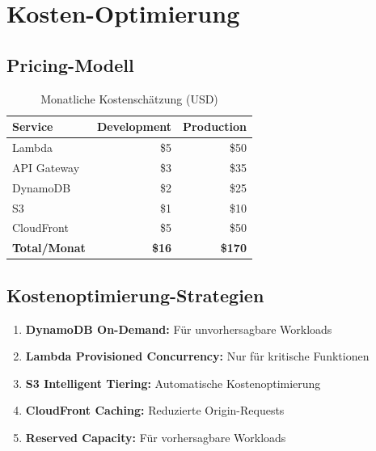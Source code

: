 \section{Kosten-Optimierung}

\subsection{Pricing-Modell}

\begin{table}[H]
    \centering
    \begin{tabular}{@{}lrr@{}}
        \toprule
        \textbf{Service} & \textbf{Development} & \textbf{Production} \\
        \midrule
        Lambda & \$5 & \$50 \\
        API Gateway & \$3 & \$35 \\
        DynamoDB & \$2 & \$25 \\
        S3 & \$1 & \$10 \\
        CloudFront & \$5 & \$50 \\
        \midrule
        \textbf{Total/Monat} & \textbf{\$16} & \textbf{\$170} \\
        \bottomrule
    \end{tabular}
    \caption{Monatliche Kostenschätzung (USD)}
    \label{tab:costs}
\end{table}

\subsection{Kostenoptimierung-Strategien}

\begin{enumerate}
    \item \textbf{DynamoDB On-Demand:} Für unvorhersagbare Workloads
    \item \textbf{Lambda Provisioned Concurrency:} Nur für kritische Funktionen
    \item \textbf{S3 Intelligent Tiering:} Automatische Kostenoptimierung
    \item \textbf{CloudFront Caching:} Reduzierte Origin-Requests
    \item \textbf{Reserved Capacity:} Für vorhersagbare Workloads
\end{enumerate}
